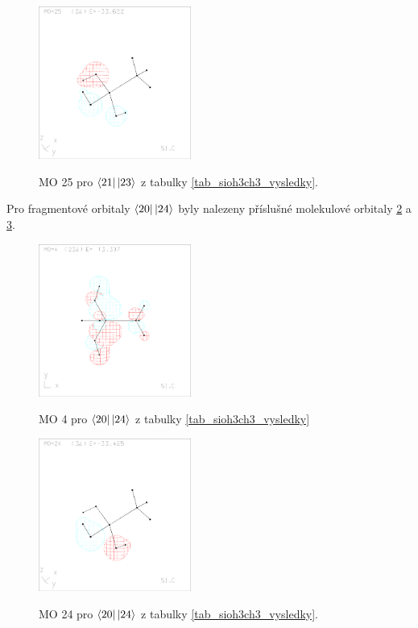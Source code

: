 \documentclass[
  digital, %
  table,   %
  lof,     %
  lot,     %
]{fithesis3}
\begin{document}
\begin{figure}[h]
\caption{MO 25 pro $\bra{21}\ket{23}$ z tabulky \ref{tab_sioh3ch3_vysledky}.  }
  \center
  \includegraphics[width=5cm]{sioh3ch3_obrazky/s3_25.eps}
  \label{obr_sioh3ch3_MO_s3_25}
  \end{figure}
  
   Pro fragmentové orbitaly $\bra{20}\ket{24}$ byly nalezeny příslušné molekulové orbitaly \ref{obr_sioh3ch3_MO_s4_4} a \ref{obr_sioh3ch3_MO_s4_24}.
  
  \begin{figure}[h]
\caption{MO 4 pro $\bra{20}\ket{24}$ z tabulky \ref{tab_sioh3ch3_vysledky}}
  \center
  \includegraphics[width=5cm]{sioh3ch3_obrazky/s4_4.eps}
  \label{obr_sioh3ch3_MO_s4_4}
  \end{figure}

\begin{figure}[h]
\caption{MO 24 pro $\bra{20}\ket{24}$ z tabulky \ref{tab_sioh3ch3_vysledky}.  }
  \center
  \includegraphics[width=5cm]{sioh3ch3_obrazky/s4_24.eps}
  \label{obr_sioh3ch3_MO_s4_24}
  \end{figure}
\end{document}
